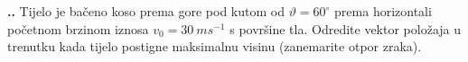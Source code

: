
\noindent 
\textbf{
\thecjelina.\thezadatak.}
Tijelo je bačeno koso prema gore pod kutom od $\vartheta=60^\circ$ prema horizontali početnom brzinom iznosa $v_0=30\ ms^{-1}$ s površine tla. Odredite vektor položaja  u trenutku kada tijelo postigne maksimalnu visinu (zanemarite otpor zraka).


